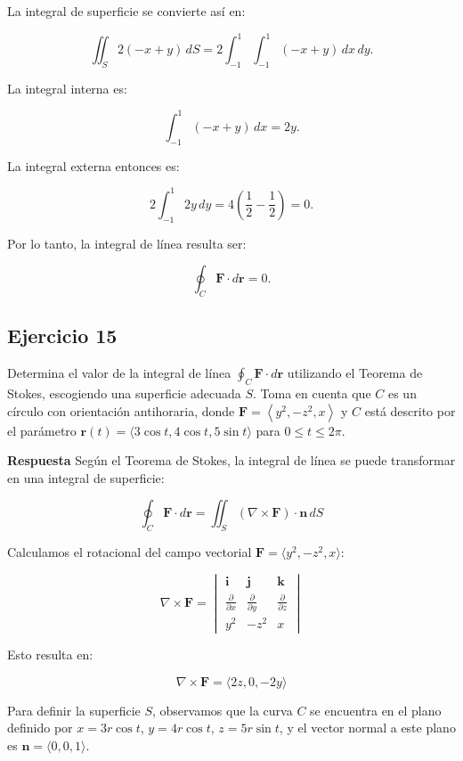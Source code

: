 \documentclass{report}
\begin{document}
La integral de superficie se convierte así en:

\[
\iint_S 2 \left( -x + y \right) \, dS = 2 \int_{-1}^1 \int_{-1}^1 (-x + y) \, dx \, dy.
\]

La integral interna es:

\[
\int_{-1}^1 (-x + y) \, dx = 2y.
\]

La integral externa entonces es:

\[
2 \int_{-1}^1 2y \, dy = 4 \left( \frac{1}{2} - \frac{1}{2} \right) = 0.
\]

Por lo tanto, la integral de línea resulta ser:

\[
{\oint_C \mathbf{F} \cdot d\mathbf{r} = 0}.
\]

\subsection*{Ejercicio 15}
Determina el valor de la integral de línea \( \oint_C \mathbf{F} \cdot d \mathbf{r} \) utilizando el Teorema de Stokes, escogiendo una superficie adecuada \( S \). Toma en cuenta que \( C \) es un círculo con orientación antihoraria, donde \( \mathbf{F}=\left\langle y^2,-z^2, x\right\rangle \) y \( C \) está descrito por el parámetro \( \mathbf{r}(t)=\langle 3 \cos t, 4 \cos t, 5 \sin t\rangle \) para \( 0 \leq t \leq 2 \pi \).

\textbf{Respuesta}
Según el Teorema de Stokes, la integral de línea se puede transformar en una integral de superficie:

\[
\oint_C \mathbf{F} \cdot d\mathbf{r} = \iint_S (\nabla \times \mathbf{F}) \cdot \mathbf{n} \, dS
\]

Calculamos el rotacional del campo vectorial \( \mathbf{F} = \langle y^2, -z^2, x \rangle \):

\[
\nabla \times \mathbf{F} = \begin{vmatrix}
\mathbf{i} & \mathbf{j} & \mathbf{k} \\
\frac{\partial}{\partial x} & \frac{\partial}{\partial y} & \frac{\partial}{\partial z} \\
y^2 & -z^2 & x
\end{vmatrix}
\]

Esto resulta en:

\[
\nabla \times \mathbf{F} = \langle 2z, 0, -2y \rangle
\]

Para definir la superficie \( S \), observamos que la curva \( C \) se encuentra en el plano definido por \( x = 3r \cos t \), \( y = 4r \cos t \), \( z = 5r \sin t \), y el vector normal a este plano es \( \mathbf{n} = \langle 0, 0, 1 \rangle \).
\end{document}
